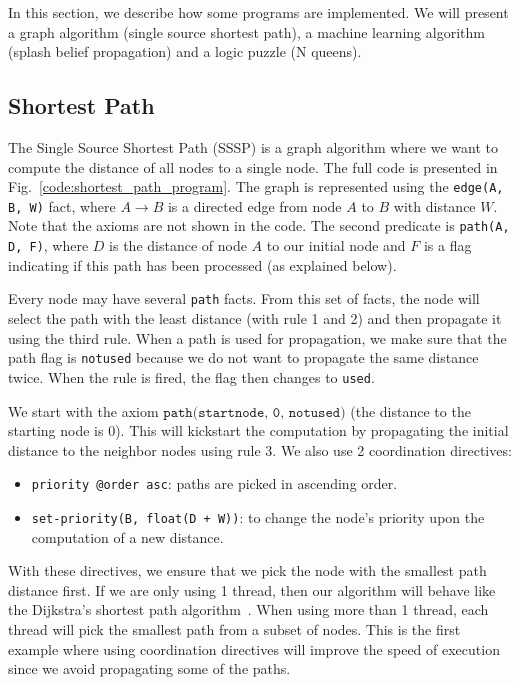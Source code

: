 In this section, we describe how some programs are implemented. We will present a graph algorithm
(single source shortest path), a machine learning algorithm (splash belief propagation) and a logic puzzle (N queens).

\subsection{Shortest Path}

The Single Source Shortest Path (SSSP) is a graph algorithm where we want to compute the
distance of all nodes to a single node. The full code is presented in Fig.~\ref{code:shortest_path_program}.
The graph is represented using the \texttt{edge(A, B, W)} fact, where $A \rightarrow B$ is a directed edge
from node $A$ to $B$ with distance $W$. Note that the axioms are not shown in the code. The second
predicate is \texttt{path(A, D, F)}, where $D$ is the distance of node $A$ to our initial node and $F$
is a flag indicating if this path has been processed (as explained below).

Every node may have several \texttt{path} facts. From this set of facts, the node will select
the path with the least distance (with rule 1 and 2) and then propagate it using the third rule.
When a path is used for propagation, we make sure that the path flag is \texttt{notused}
because we do not want to propagate the same distance twice. When the rule is fired, the flag
then changes to \texttt{used}.

We start with the axiom $\texttt{path(startnode, 0, notused)}$ (the distance to the starting node is 0).
This will kickstart the computation by propagating the initial distance to the neighbor nodes using
rule 3. We also use 2 coordination directives:

\begin{itemize}
   \item \texttt{priority @order asc}: paths are picked in ascending order.
   \item \texttt{set-priority(B, float(D + W))}: to change the node's priority upon the computation of
a new distance.
\end{itemize}

With these directives, we ensure that we pick the node with the smallest path distance
first. If we are only using 1 thread, then our algorithm will behave like the Dijkstra's shortest
path algorithm~\cite{Dijkstra}. When using more than 1 thread, each thread will pick the smallest
path from a subset of nodes. This is the first example where using coordination directives will
improve the speed of execution since we avoid propagating some of the paths.

